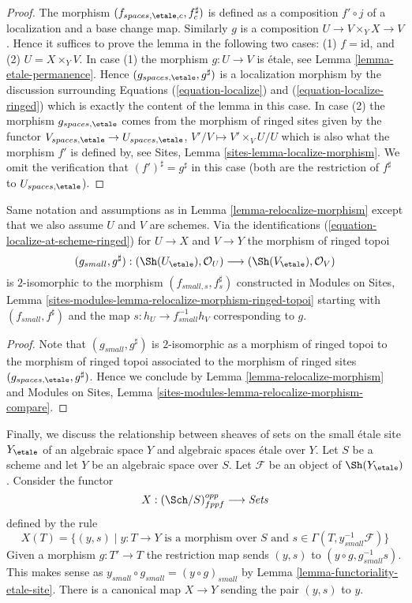 \begin{proof}
The morphism $(f_{spaces, \etale, c}, f_c^\sharp)$ is defined as a
composition $f' \circ j$
of a localization and a base change map. Similarly $g$ is a composition
$U \to V \times_Y X \to V$. Hence it suffices to prove
the lemma in the following two cases: (1) $f = \text{id}$, and
(2) $U = X \times_Y V$. In case (1) the morphism $g : U \to V$ is
\'etale, see
Lemma \ref{lemma-etale-permanence}.
Hence $(g_{spaces, \etale}, g^\sharp)$ is a localization morphism
by the discussion surrounding
Equations (\ref{equation-localize}) and
(\ref{equation-localize-ringed})
which is exactly the content of the lemma in this case.
In case (2) the morphism $g_{spaces, \etale}$
comes from the morphism of ringed sites given by the functor
$V_{spaces, \etale} \to U_{spaces, \etale}$,
$V'/V \mapsto V' \times_V U/U$
which is also what the morphism $f'$ is defined by, see
Sites, Lemma \ref{sites-lemma-localize-morphism}.
We omit the verification that $(f')^\sharp = g^\sharp$
in this case (both are the restriction of $f^\sharp$
to $U_{spaces, \etale}$).
\end{proof}

\begin{lemma}
\label{lemma-relocalize-morphism-at-schemes}
Same notation and assumptions as in
Lemma \ref{lemma-relocalize-morphism}
except that we also assume $U$ and $V$ are schemes.
Via the identifications
(\ref{equation-localize-at-scheme-ringed})
for $U \to X$ and $V \to Y$ the morphism of ringed topoi
$$
(g_{small}, g^\sharp) :
(\Sh(U_\etale), \mathcal{O}_U)
\longrightarrow
(\Sh(V_\etale), \mathcal{O}_V)
$$
is $2$-isomorphic to the morphism $(f_{small, s}, f_s^\sharp)$
constructed in
Modules on Sites,
Lemma \ref{sites-modules-lemma-relocalize-morphism-ringed-topoi}
starting with $(f_{small}, f^\sharp)$ and
the map $s : h_U \to f_{small}^{-1}h_V$ corresponding to $g$.
\end{lemma}

\begin{proof}
Note that $(g_{small}, g^\sharp)$ is $2$-isomorphic as a
morphism of ringed topoi to the morphism of ringed topoi
associated to the morphism of ringed sites
$(g_{spaces, \etale}, g^\sharp)$. Hence we conclude by
Lemma \ref{lemma-relocalize-morphism}
and
Modules on Sites,
Lemma \ref{sites-modules-lemma-relocalize-morphism-compare}.
\end{proof}

\noindent
Finally, we discuss the relationship between sheaves of sets on the small
\'etale site $Y_\etale$ of an algebraic space $Y$ and algebraic spaces
\'etale over $Y$. Let $S$ be a scheme and let $Y$ be an algebraic space
over $S$. Let $\mathcal{F}$ be an object of $\Sh(Y_\etale)$. Consider
the functor
$$
X : (\Sch/S)_{fppf}^{opp} \longrightarrow \textit{Sets}
$$
defined by the rule
$$
X(T) = \{(y, s) \mid y : T \to Y\text{ is a morphism over }S\text{ and }
s \in \Gamma(T, y_{small}^{-1}\mathcal{F})\}
$$
Given a morphism $g : T' \to T$ the restriction map sends
$(y, s)$ to $(y \circ g, g_{small}^{-1}s)$. This makes sense
as $y_{small} \circ g_{small} = (y \circ g)_{small}$ by
Lemma \ref{lemma-functoriality-etale-site}. There is a canonical map
$X \to Y$ sending the pair $(y, s)$ to $y$.

